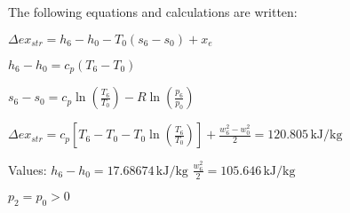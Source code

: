 The following equations and calculations are written:  

\( \Delta ex_{str} = h_6 - h_0 - T_0 (s_6 - s_0) + x_e \)  

\( h_6 - h_0 = c_p (T_6 - T_0) \)  

\( s_6 - s_0 = c_p \ln (\frac{T_6}{T_0}) - R \ln (\frac{p_6}{p_0}) \)  

\( \Delta ex_{str} = c_p [T_6 - T_0 - T_0 \ln (\frac{T_6}{T_0})] + \frac{w_6^2 - w_0^2}{2} = 120.805 \, \text{kJ/kg} \)  

Values:  
\( h_6 - h_0 = 17.68674 \, \text{kJ/kg} \)  
\( \frac{w_6^2}{2} = 105.646 \, \text{kJ/kg} \)  

\( p_2 = p_0 > 0 \)